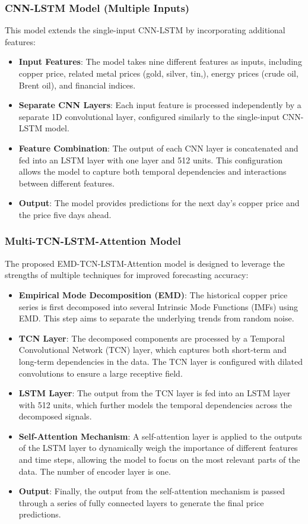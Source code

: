 \documentclass[final-report]{report-template}
\begin{document}
\subsubsection{\textbf{CNN-LSTM Model (Multiple Inputs)}}
This model extends the single-input CNN-LSTM by incorporating additional features:
\begin{itemize}
    \item \textbf{Input Features}: The model takes nine different features as inputs, including copper price, related metal prices (gold, silver, tin,), energy prices (crude oil, Brent oil), and financial indices.
    \item \textbf{Separate CNN Layers}: Each input feature is processed independently by a separate 1D convolutional layer, configured similarly to the single-input CNN-LSTM model.
    \item \textbf{Feature Combination}: The output of each CNN layer is concatenated and fed into an LSTM layer with one layer and 512 units. This configuration allows the model to capture both temporal dependencies and interactions between different features.
    \item \textbf{Output}: The model provides predictions for the next day's copper price and the price five days ahead.
\end{itemize}

\subsubsection{\textbf{Multi-TCN-LSTM-Attention Model}}
The proposed EMD-TCN-LSTM-Attention model is designed to leverage the strengths of multiple techniques for improved forecasting accuracy:
\begin{itemize}
    \item \textbf{Empirical Mode Decomposition (EMD)}: The historical copper price series is first decomposed into several Intrinsic Mode Functions (IMFs) using EMD. This step aims to separate the underlying trends from random noise.
    \item \textbf{TCN Layer}: The decomposed components are processed by a Temporal Convolutional Network (TCN) layer, which captures both short-term and long-term dependencies in the data. The TCN layer is configured with dilated convolutions to ensure a large receptive field.
    \item \textbf{LSTM Layer}: The output from the TCN layer is fed into an LSTM layer with 512 units, which further models the temporal dependencies across the decomposed signals.
    \item \textbf{Self-Attention Mechanism}: A self-attention layer is applied to the outputs of the LSTM layer to dynamically weigh the importance of different features and time steps, allowing the model to focus on the most relevant parts of the data. The number of encoder layer is one.
    \item \textbf{Output}: Finally, the output from the self-attention mechanism is passed through a series of fully connected layers to generate the final price predictions.
\end{itemize}
\end{document}
